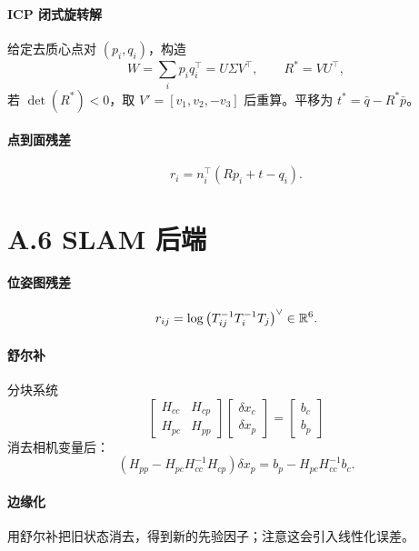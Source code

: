\paragraph{ICP 闭式旋转解}
给定去质心点对 $(p_i,q_i)$，构造
\begin{equation}
W=\sum_i p_iq_i^{\top}=U\Sigma V^{\top},\qquad
R^{*}=VU^{\top},
\end{equation}
若 $\det(R^{*})<0$，取 $V'=[v_1,v_2,-v_3]$ 后重算。平移为 $t^{*}=\bar{q}-R^{*}\bar{p}$。

\paragraph{点到面残差}
\begin{equation}
r_i=n_i^{\top}\left(Rp_i+t-q_i\right).
\end{equation}

\section*{A.6 SLAM 后端}

\paragraph{位姿图残差}
\begin{equation}
r_{ij}=\log\left(T_{ij}^{-1}T_i^{-1}T_j\right)^{\vee}\in\mathbb{R}^{6}.
\end{equation}

\paragraph{舒尔补}
分块系统
\begin{equation}
\begin{bmatrix}H_{cc}&H_{cp}\\H_{pc}&H_{pp}\end{bmatrix}
\begin{bmatrix}\delta x_c\\\delta x_p\end{bmatrix}
=
\begin{bmatrix}b_c\\b_p\end{bmatrix}
\end{equation}
消去相机变量后：
\begin{equation}
\left(H_{pp}-H_{pc}H_{cc}^{-1}H_{cp}\right)\delta x_p
=b_p-H_{pc}H_{cc}^{-1}b_c.
\end{equation}

\paragraph{边缘化}
用舒尔补把旧状态消去，得到新的先验因子；注意这会引入线性化误差。

